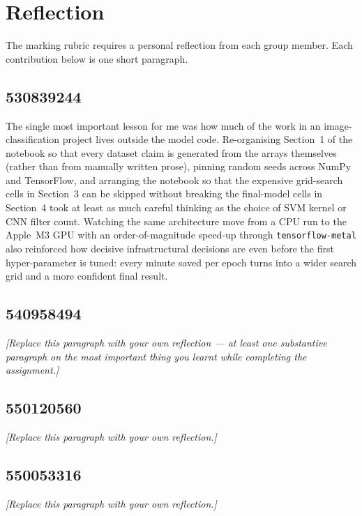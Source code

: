 \documentclass[../main.tex]{subfiles}
\begin{document}
\section{Reflection}
\noindent
The marking rubric requires a personal reflection from each group member.
Each contribution below is one short paragraph.

\subsection*{530839244}
\noindent
The single most important lesson for me was how much of the work in an
image-classification project lives outside the model code. Re-organising
Section~1 of the notebook so that every dataset claim is generated from the
arrays themselves (rather than from manually written prose), pinning random
seeds across NumPy and TensorFlow, and arranging the notebook so that the
expensive grid-search cells in Section~3 can be skipped without breaking the
final-model cells in Section~4 took at least as much careful thinking as the
choice of SVM kernel or CNN filter count. Watching the same architecture
move from a CPU run to the Apple~M3 GPU with an order-of-magnitude speed-up
through \texttt{tensorflow-metal} also reinforced how decisive
infrastructural decisions are even before the first hyper-parameter is
tuned: every minute saved per epoch turns into a wider search grid and a
more confident final result.

\subsection*{540958494}
\noindent
\textit{[Replace this paragraph with your own reflection — at least one
substantive paragraph on the most important thing you learnt while
completing the assignment.]}

\subsection*{550120560}
\noindent
\textit{[Replace this paragraph with your own reflection.]}

\subsection*{550053316}
\noindent
\textit{[Replace this paragraph with your own reflection.]}
\end{document}
